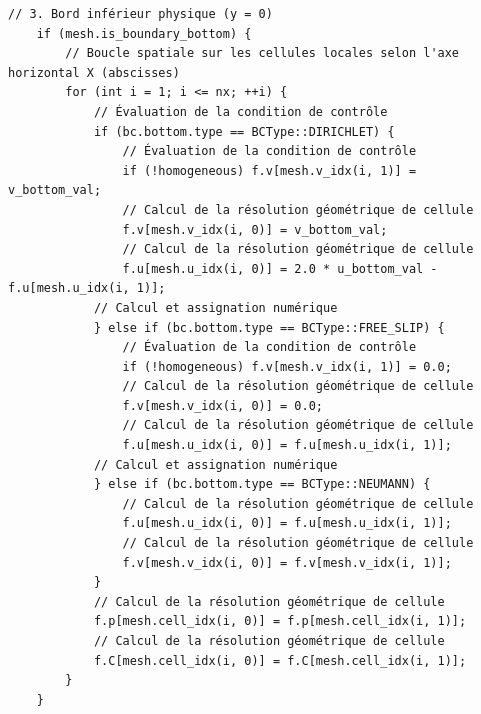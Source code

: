 \documentclass[10pt,a4paper,oneside]{book}
\begin{document}
\begin{lstlisting}[language={[11]C++}]
    // 3. Bord inférieur physique (y = 0)
    if (mesh.is_boundary_bottom) {
        // Boucle spatiale sur les cellules locales selon l'axe horizontal X (abscisses)
        for (int i = 1; i <= nx; ++i) {
            // Évaluation de la condition de contrôle
            if (bc.bottom.type == BCType::DIRICHLET) {
                // Évaluation de la condition de contrôle
                if (!homogeneous) f.v[mesh.v_idx(i, 1)] = v_bottom_val;
                // Calcul de la résolution géométrique de cellule
                f.v[mesh.v_idx(i, 0)] = v_bottom_val;
                // Calcul de la résolution géométrique de cellule
                f.u[mesh.u_idx(i, 0)] = 2.0 * u_bottom_val - f.u[mesh.u_idx(i, 1)];
            // Calcul et assignation numérique
            } else if (bc.bottom.type == BCType::FREE_SLIP) {
                // Évaluation de la condition de contrôle
                if (!homogeneous) f.v[mesh.v_idx(i, 1)] = 0.0;
                // Calcul de la résolution géométrique de cellule
                f.v[mesh.v_idx(i, 0)] = 0.0;
                // Calcul de la résolution géométrique de cellule
                f.u[mesh.u_idx(i, 0)] = f.u[mesh.u_idx(i, 1)];
            // Calcul et assignation numérique
            } else if (bc.bottom.type == BCType::NEUMANN) {
                // Calcul de la résolution géométrique de cellule
                f.u[mesh.u_idx(i, 0)] = f.u[mesh.u_idx(i, 1)];
                // Calcul de la résolution géométrique de cellule
                f.v[mesh.v_idx(i, 0)] = f.v[mesh.v_idx(i, 1)];
            }
            // Calcul de la résolution géométrique de cellule
            f.p[mesh.cell_idx(i, 0)] = f.p[mesh.cell_idx(i, 1)];
            // Calcul de la résolution géométrique de cellule
            f.C[mesh.cell_idx(i, 0)] = f.C[mesh.cell_idx(i, 1)];
        }
    }


\end{lstlisting}
\end{document}

